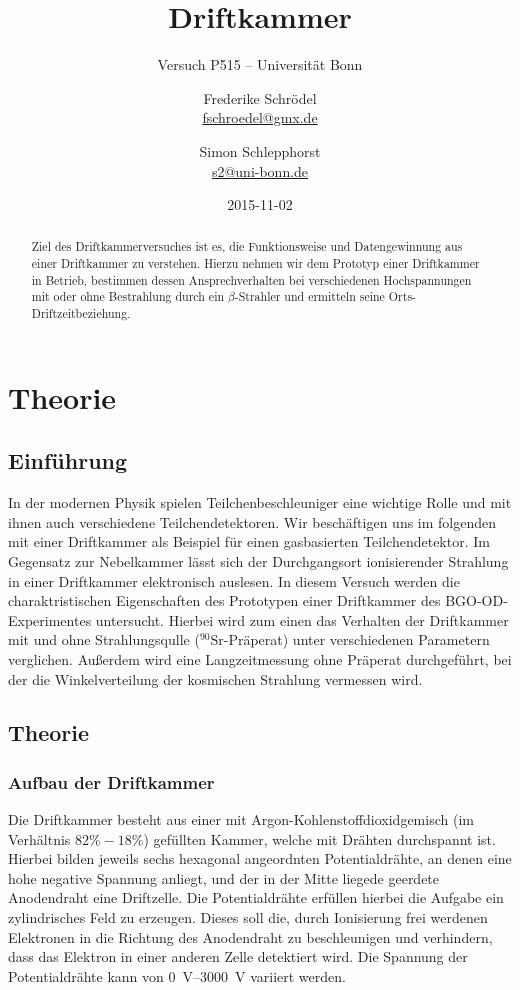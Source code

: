 \documentclass[11pt, ngerman, fleqn, DIV=15, headinclude, BCOR=2cm]{scrreprt}
\title{Driftkammer}
\subtitle{Versuch P515 -- Universität Bonn}
\author{
	Frederike Schrödel \\
	\small{\href{mailto:fschroedel@gmx.de}{fschroedel@gmx.de}}
	\and
	Simon Schlepphorst \\
	\small{\href{mailto:s2@uni-bonn.de}{s2@uni-bonn.de}}
}
\date{2015-11-02}
\begin{document}
\maketitle

\begin{abstract}
Ziel des Driftkammerversuches ist es, die Funktionsweise und Datengewinnung aus einer Driftkammer zu verstehen.
Hierzu nehmen wir dem Prototyp einer Driftkammer in Betrieb, 
bestimmen dessen Ansprechverhalten bei verschiedenen Hochspannungen mit oder ohne Bestrahlung durch ein $\beta$-Strahler  
und ermitteln seine Orts-Driftzeitbeziehung.
\end{abstract}

\tableofcontents

\chapter{Theorie}

\section{Einführung}
In der modernen Physik spielen Teilchenbeschleuniger eine wichtige Rolle und 
mit ihnen auch verschiedene Teilchendetektoren.
Wir beschäftigen uns im folgenden mit einer Driftkammer als Beispiel für einen 
gasbasierten Teilchendetektor.
Im Gegensatz zur Nebelkammer lässt sich der Durchgangsort ionisierender
Strahlung in einer Driftkammer elektronisch auslesen.
In diesem Versuch werden die charaktristischen Eigenschaften des Prototypen 
einer Driftkammer des BGO-OD-Experimentes untersucht.
Hierbei wird zum einen das Verhalten der Driftkammer mit und ohne
Strahlungsqulle ($^{90}\text{Sr}$-Präperat) unter verschiedenen Parametern verglichen.
Außerdem wird eine Langzeitmessung ohne Präperat durchgeführt, bei der die 
Winkelverteilung der kosmischen Strahlung vermessen wird.

\section{Theorie}
\subsection{Aufbau der Driftkammer}
Die Driftkammer besteht aus einer mit Argon-Kohlenstoffdioxidgemisch 
(im Verhältnis $ 82\%-18\% $) gefüllten Kammer, welche mit Drähten durchspannt
ist. Hierbei bilden jeweils sechs hexagonal angeordnten Potentialdrähte, an
denen eine hohe negative Spannung anliegt, und der in der Mitte liegede geerdete 
Anodendraht eine Driftzelle.
Die Potentialdrähte erfüllen hierbei die Aufgabe ein zylindrisches Feld zu 
erzeugen. Dieses soll die, durch Ionisierung frei werdenen Elektronen in die 
Richtung des Anodendraht zu beschleunigen und verhindern, dass das Elektron in 
einer anderen Zelle detektiert wird.
Die Spannung der Potentialdrähte kann von \SIrange{0}{3000}{\volt} variiert werden.
\end{document}
